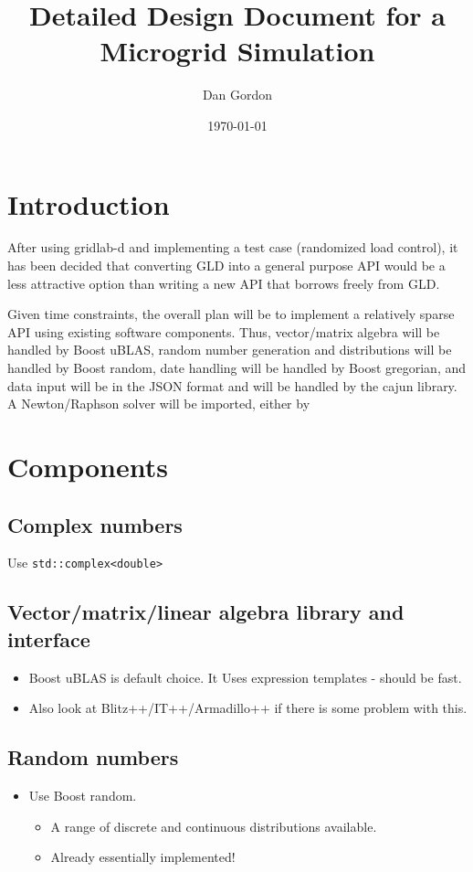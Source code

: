 \documentclass[12pt]{article}
\title{Detailed Design Document for a Microgrid Simulation}
\author{Dan Gordon}
\date{\today}
\newcommand{\itm}[1]{\begin{itemize}#1\end{itemize}}
\begin{document}
\maketitle


\section{Introduction}
After using gridlab-d and implementing a test case (randomized load control), it has been decided that converting GLD into a general purpose API would be a less attractive option than writing a new API that borrows freely from GLD.

Given time constraints, the overall plan will be to implement a relatively sparse API using existing software components. Thus, vector/matrix algebra will be handled by Boost uBLAS, random number generation and distributions will be handled by Boost random, date handling will be handled by Boost gregorian, and data input will be in the JSON format and will be handled by the cajun library.  A Newton/Raphson solver will be imported, either by 

\section{Components}

\subsection{Complex numbers}
Use \verb|std::complex<double>|

\subsection{Vector/matrix/linear algebra library and interface}
\itm{
	\item Boost uBLAS is default choice. It Uses expression templates - should be fast.
	\item Also look at Blitz++/IT++/Armadillo++ if there is some problem with this.
}

\subsection{Random numbers}
\itm{
	\item Use Boost random.
	\itm{
		\item A range of discrete and continuous distributions available.
		\item Already essentially implemented!
	}
}
\end{document}
